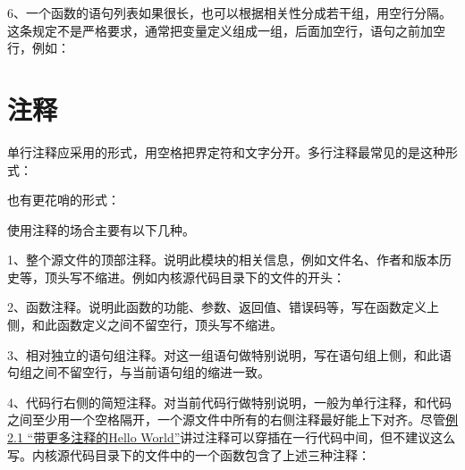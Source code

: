 

6、一个函数的语句列表如果很长，也可以根据相关性分成若干组，用空行分隔。这条规定不是严格要求，通常把变量定义组成一组，后面加空行，语句之前加空行，例如：






\section{注释}
%
单行注释应采用的形式，用空格把界定符和文字分开。多行注释最常见的是这种形式：




也有更花哨的形式：




使用注释的场合主要有以下几种。



1、整个源文件的顶部注释。说明此模块的相关信息，例如文件名、作者和版本历史等，顶头写不缩进。例如内核源代码目录下的文件的开头：




2、函数注释。说明此函数的功能、参数、返回值、错误码等，写在函数定义上侧，和此函数定义之间不留空行，顶头写不缩进。



3、相对独立的语句组注释。对这一组语句做特别说明，写在语句组上侧，和此语句组之间不留空行，与当前语句组的缩进一致。



4、代码行右侧的简短注释。对当前代码行做特别说明，一般为单行注释，和代码之间至少用一个空格隔开，一个源文件中所有的右侧注释最好能上下对齐。尽管\hyperlink{db.ch02s01.id2706541}{例 2.\BookSplit{}1 “带更多注释的Hello World”}讲过注释可以穿插在一行代码中间，但不建议这么写。内核源代码目录下的文件中的一个函数包含了上述三种注释：


